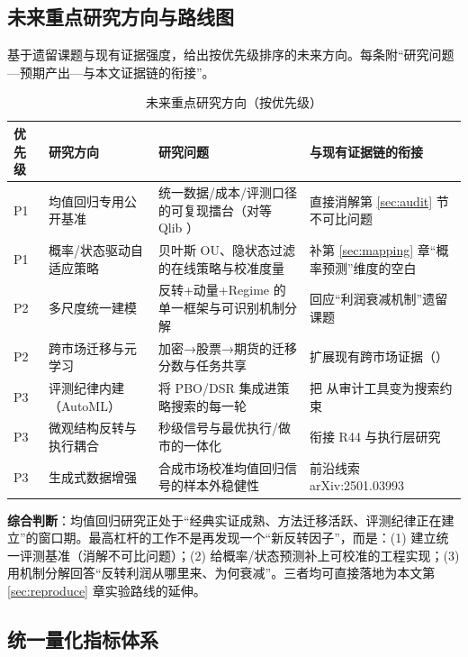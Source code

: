 \subsection{未来重点研究方向与路线图}

基于遗留课题与现有证据强度，给出按优先级排序的未来方向。每条附“研究问题—预期产出—与本文证据链的衔接”。

\begin{table}[htbp]
\centering
\caption{未来重点研究方向（按优先级）}
\label{tab:future}
\footnotesize
\begin{tabular}{@{}>{\raggedright\arraybackslash}p{1.0cm}>{\raggedright\arraybackslash}p{4.2cm}>{\raggedright\arraybackslash}p{4.4cm}>{\raggedright\arraybackslash}p{4.4cm}@{}}
\toprule
优先级 & 研究方向 & 研究问题 & 与现有证据链的衔接 \\
\midrule
P1 & 均值回归专用公开基准 & 统一数据/成本/评测口径的可复现擂台（对等 Qlib \cite{qlib}） & 直接消解第 \ref{sec:audit} 节不可比问题 \\
P1 & 概率/状态驱动自适应策略 & 贝叶斯 OU、隐状态过滤的在线策略与校准度量 & 补第 \ref{sec:mapping} 章“概率预测”维度的空白 \\
P2 & 多尺度统一建模 & 反转+动量+Regime 的单一框架与可识别机制分解 & 回应“利润衰减机制”遗留课题 \\
P2 & 跨市场迁移与元学习 & 加密→股票→期货的迁移分数与任务共享 & 扩展现有跨市场证据（\cite{arxiv_crypto_coint,arxiv_tse,arxiv_poland_sa}） \\
P3 & 评测纪律内建（AutoML） & 将 PBO/DSR 集成进策略搜索的每一轮 & 把 \cite{bailey2014pbo,bailey2014dsr} 从审计工具变为搜索约束 \\
P3 & 微观结构反转与执行耦合 & 秒级信号与最优执行/做市的一体化 & 衔接 R44 \cite{arxiv_microstructure} 与执行层研究 \\
P3 & 生成式数据增强 & 合成市场校准均值回归信号的样本外稳健性 & 前沿线索 arXiv:2501.03993 \\
\bottomrule
\end{tabular}
\end{table}

\noindent\textbf{综合判断}：均值回归研究正处于“经典实证成熟、方法迁移活跃、评测纪律正在建立”的窗口期。最高杠杆的工作不是再发现一个“新反转因子”，而是：(1) 建立统一评测基准（消解不可比问题）；(2) 给概率/状态预测补上可校准的工程实现；(3) 用机制分解回答“反转利润从哪里来、为何衰减”。三者均可直接落地为本文第 \ref{sec:reproduce} 章实验路线的延伸。

\subsection{统一量化指标体系}\label{sec:metrics}

